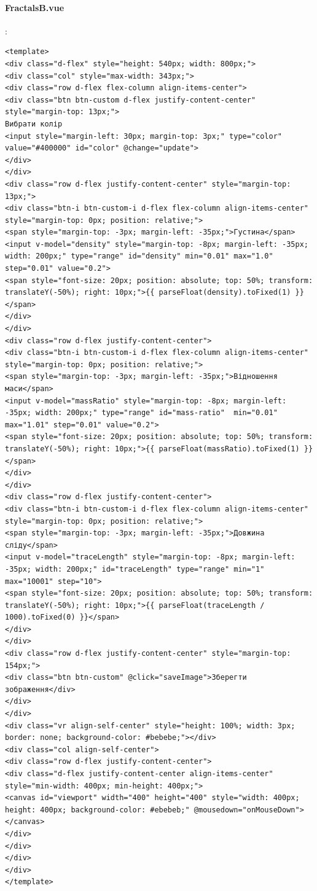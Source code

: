 \documentclass[oneside,14pt]{extarticle}
\begin{document}
\begin{normalsize}
		\paragraph{FractalsB.vue}
		:
		\begin{tiny}
		\begin{lstlisting}
<template>
<div class="d-flex" style="height: 540px; width: 800px;">
<div class="col" style="max-width: 343px;">
<div class="row d-flex flex-column align-items-center">
<div class="btn btn-custom d-flex justify-content-center" style="margin-top: 13px;">
Вибрати колір
<input style="margin-left: 30px; margin-top: 3px;" type="color" value="#400000" id="color" @change="update">
</div>
</div>
<div class="row d-flex justify-content-center" style="margin-top: 13px;">
<div class="btn-i btn-custom-i d-flex flex-column align-items-center" style="margin-top: 0px; position: relative;">
<span style="margin-top: -3px; margin-left: -35px;">Густина</span>
<input v-model="density" style="margin-top: -8px; margin-left: -35px; width: 200px;" type="range" id="density" min="0.01" max="1.0" step="0.01" value="0.2">
<span style="font-size: 20px; position: absolute; top: 50%; transform: translateY(-50%); right: 10px;">{{ parseFloat(density).toFixed(1) }}</span>
</div>
</div>
<div class="row d-flex justify-content-center">
<div class="btn-i btn-custom-i d-flex flex-column align-items-center" style="margin-top: 0px; position: relative;">
<span style="margin-top: -3px; margin-left: -35px;">Відношення маси</span>
<input v-model="massRatio" style="margin-top: -8px; margin-left: -35px; width: 200px;" type="range" id="mass-ratio"  min="0.01" max="1.01" step="0.01" value="0.2">
<span style="font-size: 20px; position: absolute; top: 50%; transform: translateY(-50%); right: 10px;">{{ parseFloat(massRatio).toFixed(1) }}</span>
</div>
</div>
<div class="row d-flex justify-content-center">
<div class="btn-i btn-custom-i d-flex flex-column align-items-center" style="margin-top: 0px; position: relative;">
<span style="margin-top: -3px; margin-left: -35px;">Довжина сліду</span>
<input v-model="traceLength" style="margin-top: -8px; margin-left: -35px; width: 200px;" id="traceLength" type="range" min="1" max="10001" step="10">
<span style="font-size: 20px; position: absolute; top: 50%; transform: translateY(-50%); right: 10px;">{{ parseFloat(traceLength / 1000).toFixed(0) }}</span>
</div>
</div>
<div class="row d-flex justify-content-center" style="margin-top: 154px;">
<div class="btn btn-custom" @click="saveImage">Зберегти зображення</div>
</div>
</div>
<div class="vr align-self-center" style="height: 100%; width: 3px; border: none; background-color: #bebebe;"></div>
<div class="col align-self-center">
<div class="row d-flex justify-content-center">
<div class="d-flex justify-content-center align-items-center" style="min-width: 400px; min-height: 400px;">
<canvas id="viewport" width="400" height="400" style="width: 400px; height: 400px; background-color: #ebebeb;" @mousedown="onMouseDown"></canvas>
</div>
</div>
</div>
</div>
</template>


\end{lstlisting}
\end{tiny}
\end{normalsize}
\end{document}
